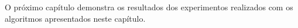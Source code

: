 






O próximo capítulo demonstra os resultados dos experimentos realizados com os algoritmos apresentados neste capítulo.

